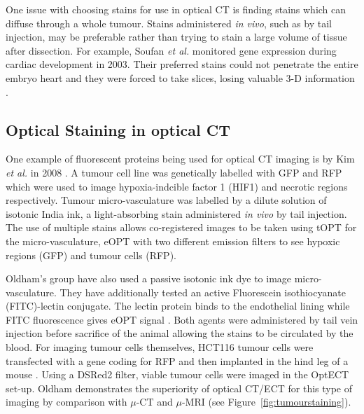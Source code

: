 	
	
	One issue with choosing stains for use in optical CT is finding stains which can diffuse through a whole tumour. Stains administered \textit{in vivo}, such as by tail injection, may be preferable rather than trying to stain a large volume of tissue after dissection. For example, Soufan \textit{et al.} monitored gene expression during cardiac development in 2003. Their preferred stains  could not penetrate the entire embryo heart and they were forced to take slices, losing valuable 3-D information \cite{Soufan:2003cd}. 
	
	
	\subsection*{Optical Staining in optical CT}
	
	One example of fluorescent proteins being used for optical CT imaging is by Kim \textit{et al.} in 2008 \cite{Kim:2008eua}. A tumour cell line was genetically labelled with GFP and RFP which were used to image hypoxia-indcible factor 1 (HIF1) and necrotic regions respectively. Tumour micro-vasculature was labelled by a dilute solution of isotonic India ink, a light-absorbing stain administered \textit{in vivo} by tail injection. The use of multiple stains allows co-registered images to be taken using tOPT for the micro-vasculature, eOPT with two different emission filters to see hypoxic regions (GFP) and tumour cells (RFP). 
	
	
	
	
	
	
	
	Oldham's group have also used a passive isotonic ink dye to image micro-vasculature. They have additionally tested an active  Fluorescein isothiocyanate (FITC)-lectin conjugate. The lectin protein binds to the endothelial lining while FITC fluorescence gives eOPT signal \cite{Oldham:2007ku}. Both agents were administered by tail vein injection before sacrifice of the animal allowing the stains to be circulated by the blood.  For imaging tumour cells themselves, HCT116 tumour cells were transfected with a gene coding for RFP and then implanted in the hind leg of a mouse \cite{Oldham:2006}. Using a DSRed2 filter, viable tumour cells were imaged in the OptECT set-up. Oldham demonstrates the superiority of optical CT/ECT for this type of imaging by comparison with $\mu$-CT and $\mu$-MRI (see Figure~\ref{fig:tumourstaining}).
	
